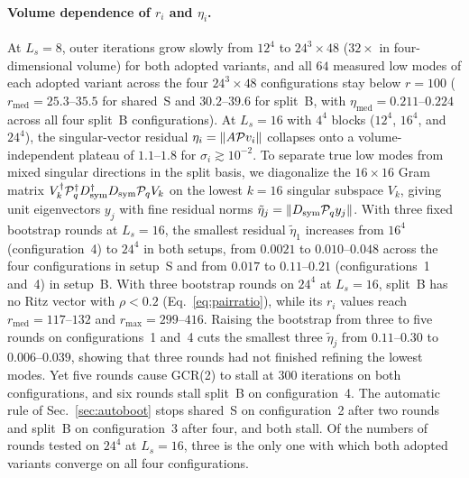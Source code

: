 \paragraph{Volume dependence of $r_i$ and $\eta_i$.}
At $L_s=8$, outer iterations grow slowly from $12^4$ to $24^3\times48$ ($32\times$ in
four-dimensional volume) for both adopted variants, and all $64$ measured low modes of each adopted
variant across the four $24^3\times48$ configurations stay below $r=100$
($r_{\mathrm{med}}=25.3$--$35.5$ for shared~S and $30.2$--$39.6$ for split~B, with
$\eta_{\mathrm{med}}=0.211$--$0.224$ across all four split~B configurations). At $L_s=16$ with
$4^4$ blocks ($12^4$, $16^4$, and $24^4$), the singular-vector residual $\eta_i=\|A\mathcal P v_i\|$
collapses onto a volume-independent plateau of $1.1$--$1.8$ for $\sigma_i\gtrsim10^{-2}$. To
separate true low modes from mixed singular directions in the split basis, we diagonalize the
$16\times16$ Gram matrix $V_k^{\dagger}\mathcal P_q^{\dagger}D_{\mathrm{sym}}^{\dagger}D_{\mathrm{sym}}\mathcal P_q V_k$ on the lowest $k=16$ singular subspace
$V_k$, giving unit eigenvectors $y_j$ with fine residual norms $\tilde\eta_j=\|D_{\mathrm{sym}}\mathcal P_q y_j\|$.
With three fixed bootstrap rounds at $L_s=16$, the smallest residual $\tilde\eta_1$ increases from
$16^4$ (configuration~4) to $24^4$ in both setups, from $0.0021$ to $0.010$--$0.048$ across the
four configurations in setup~S and from $0.017$ to $0.11$--$0.21$ (configurations~1 and~4) in
setup~B. With three bootstrap rounds on $24^4$ at $L_s=16$, split~B has no Ritz vector with
$\rho<0.2$ (Eq.~\eqref{eq:pairratio}),
while its $r_i$ values reach $r_{\mathrm{med}}=117$--$132$ and $r_{\max}=299$--$416$. Raising the bootstrap from three to five rounds on
configurations~1 and~4 cuts the smallest three $\tilde\eta_j$ from $0.11$--$0.30$ to
$0.006$--$0.039$, showing that three rounds had not finished refining the lowest modes. Yet five
rounds cause GCR(2) to stall at $300$ iterations on both configurations, and six rounds stall
split~B on configuration~4. The automatic rule of Sec.~\ref{sec:autoboot} stops shared~S on
configuration~2 after two rounds and split~B on configuration~3 after four, and both stall. Of the
numbers of rounds tested on $24^4$ at $L_s=16$, three is the only one with which both adopted
variants converge on all four configurations.

